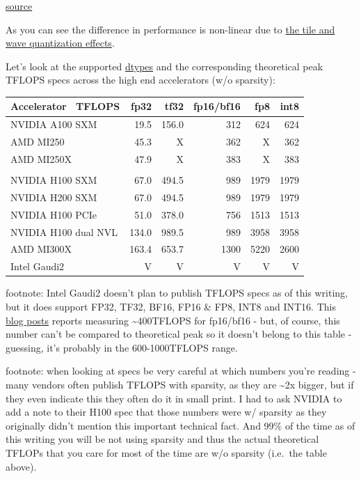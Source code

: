 \documentclass[
]{report}
\begin{document}
\href{https://developer.nvidia.com/blog/cuda-11-features-revealed/}{source}

As you can see the difference in performance is non-linear due to
\href{../../training/performance\#tile-and-wave-quantization}{the tile
and wave quantization effects}.

Let's look at the supported \href{../../training/dtype.md}{dtypes} and
the corresponding theoretical peak TFLOPS specs across the high end
accelerators (w/o sparsity):

\begin{longtable}[]{@{}lrrrrr@{}}
\toprule\noalign{}
Accelerator ~TFLOPS & fp32 & tf32 & fp16/bf16 & fp8 & int8 \\
\midrule\noalign{}
\endhead
\bottomrule\noalign{}
\endlastfoot
NVIDIA A100 SXM & 19.5 & 156.0 & 312 & 624 & 624 \\
AMD MI250 & 45.3 & X & 362 & X & 362 \\
AMD MI250X & 47.9 & X & 383 & X & 383 \\
& & & & & \\
NVIDIA H100 SXM & 67.0 & 494.5 & 989 & 1979 & 1979 \\
NVIDIA H200 SXM & 67.0 & 494.5 & 989 & 1979 & 1979 \\
NVIDIA H100 PCIe & 51.0 & 378.0 & 756 & 1513 & 1513 \\
NVIDIA H100 dual NVL & 134.0 & 989.5 & 989 & 3958 & 3958 \\
AMD MI300X & 163.4 & 653.7 & 1300 & 5220 & 2600 \\
Intel Gaudi2 & V & V & V & V & V \\
\end{longtable}

footnote: Intel Gaudi2 doesn't plan to publish TFLOPS specs as of this
writing, but it does support FP32, TF32, BF16, FP16 \& FP8, INT8 and
INT16. This
\href{https://www.databricks.com/blog/llm-training-and-inference-intel-gaudi2-ai-accelerators}{blog
posts} reports measuring \textasciitilde400TFLOPS for fp16/bf16 - but,
of course, this number can't be compared to theoretical peak so it
doesn't belong to this table - guessing, it's probably in the
600-1000TFLOPS range.

footnote: when looking at specs be very careful at which numbers you're
reading - many vendors often publish TFLOPS with sparsity, as they are
\textasciitilde2x bigger, but if they even indicate this they often do
it in small print. I had to ask NVIDIA to add a note to their H100 spec
that those numbers were w/ sparsity as they originally didn't mention
this important technical fact. And 99\% of the time as of this writing
you will be not using sparsity and thus the actual theoretical TFLOPs
that you care for most of the time are w/o sparsity (i.e.~the table
above).
\end{document}
